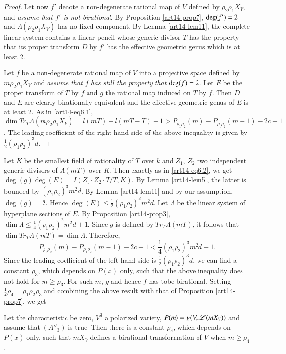 \begin{proof}
Let now $f'$ denote a non-degenerate rational map of $V$ defined by $\rho_{2}\rho_{1}X_{V}$, and {\em assume that $f'$ is not birational}. By Proposition \ref{art14-prop7}, $\deg\break (f')=2$ and $\Lambda(\rho_{2}\rho_{1}X_{V})$ has no fixed component. By Lemma \ref{art14-lem11}, the complete linear system contains a linear pencil whose generic divisor $T$ has the property that its proper transform $D$ by $f'$ has the effective geometric genus which is at least 2.

Let $f$ be a non-degenerate rational map of $V$ into a projective space defined by $m\rho_{2}\rho_{1}X_{V}$ and {\em assume that $f$ has still the property that $\deg\break (f)=2$}. Let $E$ be the proper transform of $T$ by $f$ and $g$ the rational map induced on $T$ by $f$. Then $D$ and $E$ are clearly birationally equivalent and the effective geometric genus of $E$ is at least $2$. As in \eqref{art14-eq6.1}, $\dim Tr_{T}\Lambda(m\rho_{2}\rho_{1}X_{V})=l(mT)-l(mT-T)-1>P_{\rho_{1}\rho_{2}}(m)-P_{\rho_{1}\rho_{2}}(m-1)-2c-1$. The leading coefficient of the right hand side of the above inequality is given by $\frac{1}{2}(\rho_{1}\rho_{2})^{3}d$.
\end{proof}

Let $K$ be the smallest field of rationality of $T$ over $k$ and $Z_{1}$, $Z_{2}$ two independent generic divisors of $\Lambda(mT)$ over $K$. Then exactly as in \eqref{art14-eq6.2}, we get $\deg(g)\deg(E)=I(Z_{1}\cdot Z_{2}\cdot T/T,K)$. By Lemma \ref{art14-lem5}, the latter is bounded by $(\rho_{1}\rho_{2})^{3}m^{2}d$. By Lemma \ref{art14-lem11} and by our assumption, $\deg(g)=2$. Hence $\deg(E)\leq \frac{1}{2}(\rho_{1}\rho_{2})^{3}m^{2}d$. Let $\Lambda$ be the linear system of hyperplane sections of $E$. By Proposition \ref{art14-prop3}, $\dim \Lambda\leq \frac{1}{4}(\rho_{1}\rho_{2})^{3}m^{2}d+1$. Since $g$ is defined by $Tr_{T}\Lambda (mT)$, it follows that $\dim Tr_{T}\Lambda(mT)=\dim \Lambda$. Therefore,
$$
P_{\rho_{1}\rho_{2}}(m)-P_{\rho_{1}\rho_{2}}(m-1)-2c-1<\frac{1}{4}(\rho_{1}\rho_{2})^{3}m^{2}d+1.
$$
Since the leading coefficient of the left hand side is $\frac{1}{2}(\rho_{1}\rho_{2})^{3}d$, we can find a constant $\rho_{3}$, which depends on $P(x)$ only, such that the above inequality does not hold for $m\geq \rho_{3}$. For such $m$, $g$ and hence $f$ has to\pageoriginale be birational. Setting $\frac{1}{2}\rho_{4}=\rho_{1}\rho_{2}\rho_{3}$ and combining the above result with that of Proposition \ref{art14-prop7}, we get

\begin{theorem}\label{art14-thm1}
Let the characteristic be zero, $V^{3}$ a polarized variety, $P(m)\break =\chi(V,\mathscr{L}(mX_{V}))$ and assume that $(A''_{3})$ is true. Then there is a constant $\rho_{4}$, which depends on $P(x)$ only, such that $mX_{V}$ defines a birational transformation of $V$ when $m\geq \rho_{4}$.
\end{theorem}

